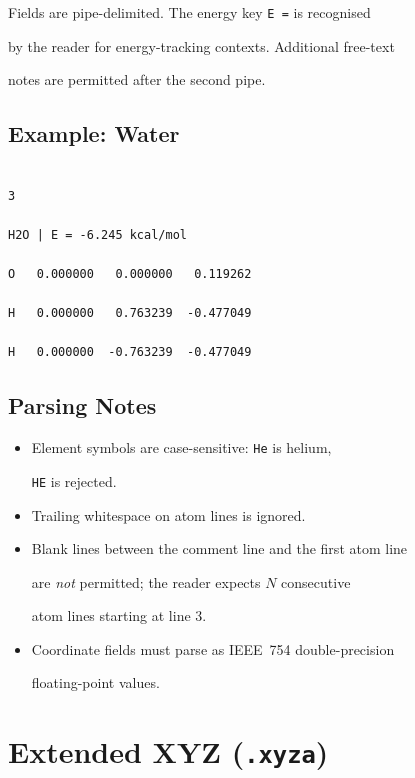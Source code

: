 \documentclass[12pt, a4paper, oneside]{article}
\begin{document}
Fields are pipe-delimited.  The energy key \texttt{E =} is recognised

by the reader for energy-tracking contexts.  Additional free-text

notes are permitted after the second pipe.


\subsection{Example: Water}


\begin{lstlisting}[language={},frame=single]

3

H2O | E = -6.245 kcal/mol

O   0.000000   0.000000   0.119262

H   0.000000   0.763239  -0.477049

H   0.000000  -0.763239  -0.477049

\end{lstlisting}


\subsection{Parsing Notes}


\begin{itemize}

  \item Element symbols are case-sensitive: \texttt{He} is helium,

        \texttt{HE} is rejected.

  \item Trailing whitespace on atom lines is ignored.

  \item Blank lines between the comment line and the first atom line

        are \emph{not} permitted; the reader expects $N$ consecutive

        atom lines starting at line 3.

  \item Coordinate fields must parse as IEEE~754 double-precision

        floating-point values.

\end{itemize}



\section{Extended XYZ (\texttt{.xyza})}
\end{document}
